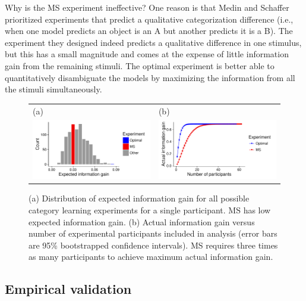 \documentclass{article}
\begin{document}
Why is the MS experiment ineffective?
One reason is that Medin and Schaffer prioritized experiments that predict a qualitative categorization difference (i.e., when one model predicts an object is an A  but another predicts it is a B).
The experiment they designed indeed predicts a qualitative difference in one stimulus, but this has a small magnitude and comes at the expense of little information gain from the remaining stimuli.
The optimal experiment is better able to quantitatively disambiguate the models by maximizing the information from all the stimuli simultaneously.

\begin{figure}[t]
\centering
\begin{tabular}{l l}
(a) & (b)\\
\includegraphics[width=2.5in]{img/category-eig-dist.pdf} & \includegraphics[width=2.5in]{img/category-aig-curve.pdf}\\
\end{tabular}
\caption{(a) Distribution of expected information gain for all possible category learning experiments for a single participant. MS has low expected information gain. (b) Actual information gain versus number of experimental participants included in analysis (error bars are 95\% bootstrapped confidence intervals). MS requires three times as many participants to achieve maximum actual information gain.}
\label{fig:dist}
\end{figure}

\subsection{Empirical validation}
\end{document}
